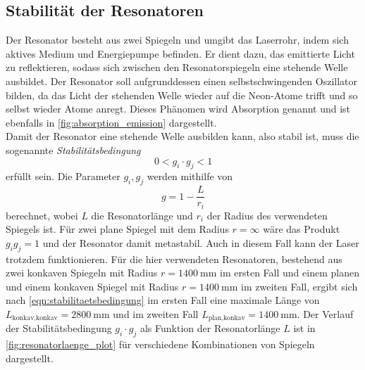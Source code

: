 \subsection{Stabilität der Resonatoren}
\label{sec:stabilitaet}

    Der Resonator besteht aus zwei Spiegeln und umgibt das Laserrohr,
    indem sich aktives Medium und Energiepumpe befinden.
    Er dient dazu,
    das emittierte Licht zu reflektieren,
    sodass sich zwischen den Resonatorspiegeln eine stehende Welle ausbildet.
    Der Resonator soll aufgrunddessen einen selbstschwingenden Oszillator bilden,
    da das Licht der stehenden Welle wieder auf die Neon-Atome trifft und so selbst wieder Atome anregt.
    Dieses Phänomen wird Absorption genannt und ist ebenfalls in \autoref{fig:absorption_emission} dargestellt.\\
    Damit der Resonator eine stehende Welle ausbilden kann,
    also stabil ist,
    muss die sogenannte \textit{Stabilitätsbedingung}
    \begin{equation}
        0 < g_i \cdot g_j < 1
        \label{eqn:stabilitaetsbedingung}
    \end{equation}
    erfüllt sein.
    Die Parameter $g_i, g_j$ werden mithilfe von
    \begin{equation}
        g = 1 - \frac{L}{r_i}
        \label{eqn:stabilitaetsparameter}
    \end{equation}
    berechnet,
    wobei $L$ die Resonatorlänge und $r_i$ der Radius des verwendeten Spiegels ist.
    Für zwei plane Spiegel mit dem Radius $r = \infty$ wäre das Produkt $g_ig_j = 1$ und der Resonator damit metastabil.
    Auch in diesem Fall kann der Laser trotzdem funktionieren.
    Für die hier verwendeten Resonatoren,
    bestehend aus zwei konkaven Spiegeln mit Radius $r = \SI{1400}{\milli\meter}$ im ersten Fall und einem planen und einem konkaven Spiegel mit Radius $r = \SI{1400}{\milli\meter}$ im zweiten Fall,
    ergibt sich nach \autoref{eqn:stabilitaetsbedingung} im ersten Fall eine maximale Länge von $L_\text{konkav,konkav} = \SI{2800}{\milli\meter}$ und im zweiten Fall $L_\text{plan,konkav} = \SI{1400}{\milli\meter}$.
    Der Verlauf der Stabilitätsbedingung $g_i \cdot g_j$ als Funktion der Resonatorlänge $L$ ist in \autoref{fig:resonatorlaenge_plot} für verschiedene Kombinationen von Spiegeln dargestellt.

